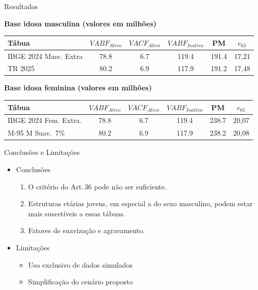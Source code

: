\documentclass[aspectratio=169, 10pt]{beamer}
\begin{document}
\begin{frame}{Resultados}

      \centering\textbf{Base idosa masculina (valores em milhões)}\\[2pt]
      \begin{tabular}{lccccc}
        \toprule
        \textbf{Tábua} & $VABF_{Ativo}$ & $VACF_{Ativo}$ & $VABF_{Inativo}$ & PM & $e_{65}$ \\
        \midrule
        IBGE 2024 Masc. Extra    & 78.8 & 6.7 & 119.4 & 191.4 & 17,21 \\
        TR 2025                  & 80.2 & 6.9 & 117.9 & 191.2 & 17,48 \\
        \bottomrule
      \end{tabular}

      \bigskip
      \centering\textbf{Base idosa feminina (valores em milhões)}\\[2pt]
      \begin{tabular}{lccccc}
        \toprule
        \textbf{Tábua} & $VABF_{Ativo}$ & $VACF_{Ativo}$ & $VABF_{Inativo}$ & PM & $e_{65}$ \\
        \midrule
        IBGE 2024 Fem. Extra.   & 78.8 & 6.7 & 119.4 & 238.7 & 20,07 \\
        M-95 M Suav.\ 7\%       & 80.2 & 6.9 & 117.9 & 238.2 & 20,08 \\
        \bottomrule
      \end{tabular}


\end{frame}

\begin{frame}{Conclusões e Limitações}

  \begin{itemize}
    \item[] Conclusões 
    \begin{enumerate}
      \item O critério do Art.\,36 pode não ser suficiente.

      \medskip
      \item Estruturas etárias jovens, em especial a do sexo masculino, podem estar mais suscetíveis a essas tábuas.

      \medskip
      \item Fatores de suavização e agravamento.
    \end{enumerate}
    \medskip
    \item[] Limitações
    \begin{itemize}
      \item Uso exclusivo de dados simulados
      \medskip
      \item Simplificação do cenário proposto
    \end{itemize} 

  \end{itemize}

\end{frame}
\end{document}
